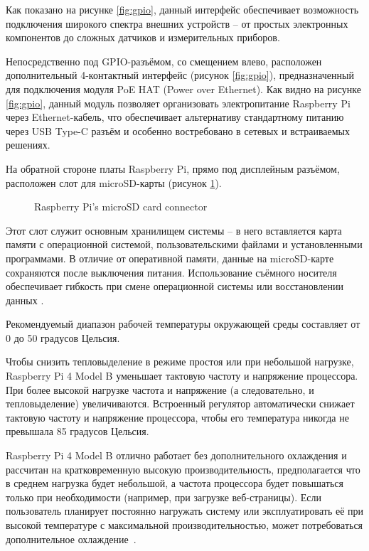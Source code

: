 Как показано на рисунке \ref{fig:gpio}, данный интерфейс обеспечивает возможность подключения широкого спектра внешних устройств -- от простых электронных компонентов  до сложных датчиков и измерительных приборов. 

Непосредственно под GPIO-разъёмом, со смещением влево, расположен дополнительный 4-контактный интерфейс (рисунок \ref{fig:gpio}), предназначенный для подключения модуля PoE HAT (Power over Ethernet). Как видно на рисунке \ref{fig:gpio}, данный модуль позволяет организовать электропитание Raspberry Pi через Ethernet-кабель, что обеспечивает альтернативу стандартному питанию через USB Type-C разъём и особенно востребовано в сетевых и встраиваемых решениях.

На обратной стороне платы Raspberry Pi, прямо под дисплейным разъёмом, расположен слот для microSD-карты (рисунок \ref{fig:microSd}).

\begin{figure}[H]
	\centering
	\caption{Raspberry Pi’s microSD card connector}
	\label{fig:microSd}
\end{figure}

Этот слот служит основным хранилищем системы -- в него вставляется карта памяти с операционной системой, пользовательскими файлами и установленными программами. В отличие от оперативной памяти, данные на microSD-карте сохраняются после выключения питания. Использование съёмного носителя обеспечивает гибкость при смене операционной системы или восстановлении данных \cite{RaspberryPi}.

Рекомендуемый диапазон рабочей температуры окружающей среды составляет от 0 до 50 градусов Цельсия.

Чтобы снизить тепловыделение в режиме простоя или при небольшой нагрузке, Raspberry Pi 4 Model B уменьшает тактовую частоту и напряжение процессора. При более высокой нагрузке частота и напряжение (а следовательно, и тепловыделение) увеличиваются. Встроенный регулятор автоматически снижает тактовую частоту и напряжение процессора, чтобы его температура никогда не превышала 85 градусов Цельсия.

Raspberry Pi 4 Model B отлично работает без дополнительного охлаждения и рассчитан на кратковременную высокую производительность, предполагается что в среднем нагрузка будет небольшой, а частота процессора будет повышаться только при необходимости (например, при загрузке веб-страницы). Если пользователь планирует постоянно нагружать систему или эксплуатировать её при высокой температуре с максимальной производительностью, может потребоваться дополнительное охлаждение~\cite{RaspberryPi_DATASHEET}.




\newpage
